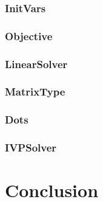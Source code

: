 \documentclass[12pt]{article}
\begin{document}
	\subsubsection{InitVars}
	\label{c:initVarsEnum}
	
	\subsubsection{Objective}
	\label{c:Objective}
	
	\subsubsection{LinearSolver}
	\label{c:LinearSolver}
	
	\subsubsection{MatrixType}
	\label{c:MatrixType}
	
	\subsubsection{Dots}
	\label{c:Dots}
	
	\subsubsection{IVPSolver}
	\label{c:IVPSolver}
	 
	\section{Conclusion}
	
\end{document}
